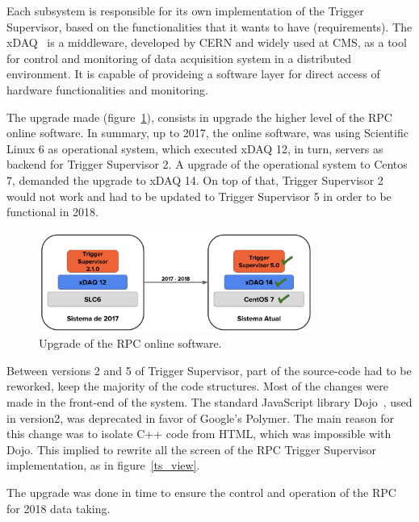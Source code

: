 Each subsystem is responsible for its own implementation of the Trigger Supervisor, based on the functionalities that it wants to have (requirements). The xDAQ~\cite{xdaq} is a middleware, developed by CERN and widely used at CMS, as a tool for control and monitoring of data acquisition system in a distributed environment. It is capable of provideing a software layer for direct access of hardware functionalities and monitoring.

The upgrade made (figure~\ref{ts_upgrade}), consists in upgrade the higher level of the RPC online software. In summary, up to 2017, the online software, was using Scientific Linux 6 as operational system, which executed xDAQ 12, in turn, servers as backend for Trigger Supervisor 2. A upgrade of the operational system to Centos 7, demanded the upgrade to xDAQ 14. On top of that, Trigger Supervisor 2 would not work and had to be updated to Trigger Supervisor 5 in order to be functional in 2018.

\begin{figure}[h]
\begin{center}
\includegraphics[width=0.8\textwidth,keepaspectratio]{figures/rpc/ts_upgrade.png}
\end{center}
\caption{Upgrade of the RPC online software.}\label{ts_upgrade}
\end{figure}

Between versions 2 and 5 of Trigger Supervisor, part of the source-code had to be reworked, keep the majority of the code structures. Most of the changes were made in the front-end of the system. The standard JavaScript library Dojo~\cite{dojo}, used in version2, was deprecated in favor of Google's Polymer\cite{polymer}. The main reason for this change was to isolate C++ code from HTML, which was impossible with Dojo. This implied to rewrite all the screen of the RPC Trigger Supervisor implementation, as in figure~\ref{ts_view}.

The upgrade  was done in time to ensure the control and operation of the RPC for 2018 data taking.

